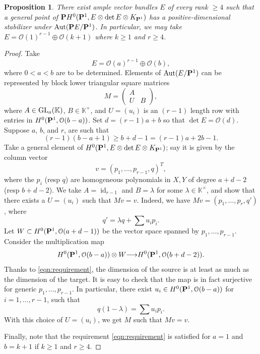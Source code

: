 \documentclass[11pt,reqno]{amsart}
\theoremstyle{plain}
\newtheorem{proposition}[theorem]{Proposition}
\theoremstyle{definition}
\theoremstyle{remark}
\numberwithin{equation}{section}
\renewcommand{\k}{\mathbb{K}}
\DeclareMathOperator{\id}{id}
\renewcommand{\to}{{\longrightarrow}}
\numberwithin{equation}{section}
\renewcommand{\O}{\mathcal O}
\begin{document}
\begin{proposition}\label{prop:specialE}
  There exist ample vector bundles $E$ of every rank $\geq 4$ such that a general point of $\P H^0(\P^1, E \otimes \det E \otimes K_{\P^1})$ has a positive-dimensional stabilizer under $\Aut(\P E/\P^1)$.
  In particular, we may take $E = \O(1)^{r-1} \oplus \O(k+1)$ where $k \geq 1$ and $r \geq 4$.
\end{proposition}
\begin{proof}
  Take
  \[ E = \O(a)^{r-1} \oplus \O(b),\]
  where $0 < a < b$ are to be determined.
  Elements of $\Aut (E/\P^1)$ can be represented by block lower triangular square matrices
  \[M = 
    \begin{pmatrix}
      A &  \\
      U & B
    \end{pmatrix},
  \]
  where $A \in \GL_a(\k)$, $B \in \k^\times$, and $U = (u_i)$ is an $(r-1)$ length row with entries in $H^0(\P^1, \O(b-a))$.
  Set $d = (r-1)a + b$ so that $\det E = \O(d)$.
  Suppose $a$, $b$, and $r$, are such that
  \begin{equation}\label{eqn:requirement}
    (r-1) (b-a+1) \geq b+d-1 = (r-1)a+2b-1.
  \end{equation}
  Take a general element of $H^0(\P^1, E \otimes \det E \otimes K_{\P^1})$; say it is given by the column vector
  \[ v = (p_1, \dots, p_{r-1}, q)^T,\]
  where the $p_i$ (resp $q$) are homogeneous polynomials in $X, Y$ of degree $a+d-2$ (resp $b+d-2$).
  We take $A = \id_{r-1}$ and $B = \lambda$ for some $\lambda \in \k^\times$, and show that there exists a $U = (u_{i})$ such that $Mv = v$.
  Indeed, we have $Mv = (p_1, \dots, p_r, q')$, where
  \[ q' = \lambda q + \sum u_{i}p_i. \]
  Let $W \subset H^0(\P^1, \O(a+d-1))$ be the vector space spanned by $p_1, \dots, p_{r-1}$.
  Consider the multiplication map
  \[ H^0(\P^1, \O(b-a)) \otimes W \to H^0(\P^1, \O(b+d-2)).\]
  Thanks to \eqref{eqn:requirement}, the dimension of the source is at least as much as the dimension of the target.
  It is easy to check that the map is in fact surjective for generic $p_1, \dots, p_{r-1}$.
  In particular, there exist $u_i \in H^0(\P^1, \O(b-a))$ for $i = 1, \dots, r-1$, such that
  \[ q(1-\lambda) = \sum u_i p_i.\]
  With this choice of $U = (u_i)$, we get $M$ such that $Mv = v$.

  Finally, note that the requirement \eqref{eqn:requirement} is satisfied for $a = 1$ and $b = k+1$ if $k \geq 1$ and $r \geq 4$.
\end{proof}
\end{document}
